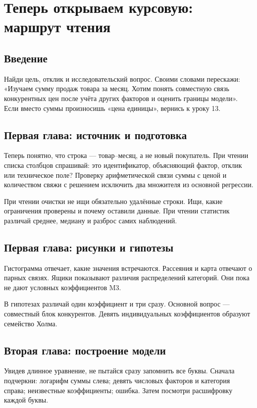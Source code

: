 \documentclass[12pt,a4paper]{article}
\begin{document}
\section{Теперь открываем курсовую: маршрут чтения}

\subsection*{Введение}

Найди цель, отклик и исследовательский вопрос. Своими словами перескажи: «Изучаем сумму продаж товара за месяц. Хотим понять совместную связь конкурентных цен после учёта других факторов и оценить границы модели». Если вместо суммы произносишь «цена единицы», вернись к уроку 13.

\subsection*{Первая глава: источник и подготовка}

Теперь понятно, что строка --- товар--месяц, а не новый покупатель. При чтении списка столбцов спрашивай: это идентификатор, объясняющий фактор, отклик или техническое поле? Проверку арифметической связи суммы с ценой и количеством свяжи с решением исключить два множителя из основной регрессии.

При чтении очистки не ищи обязательно удалённые строки. Ищи, какие ограничения проверены и почему оставили данные. При чтении статистик различай среднее, медиану и разброс самих наблюдений.

\subsection*{Первая глава: рисунки и гипотезы}

Гистограмма отвечает, какие значения встречаются. Рассеяния и карта отвечают о парных связях. Ящики показывают различия распределений категорий. Они пока не дают условных коэффициентов M3.

В гипотезах различай один коэффициент и три сразу. Основной вопрос --- совместный блок конкурентов. Девять индивидуальных коэффициентов образуют семейство Холма.

\subsection*{Вторая глава: построение модели}

Увидев длинное уравнение, не пытайся сразу запомнить все буквы. Сначала подчеркни: логарифм суммы слева; девять числовых факторов и категория справа; неизвестные коэффициенты; ошибка. Затем посмотри расшифровку каждой буквы.
\end{document}
